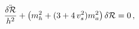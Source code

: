 \begin{equation}\label{fluctuation}
{{\ddot{\delta{\cal R}}}\over h^2} + \left( m_h ^2 + (3+ 4 \, v_s ^2)
  m_a ^2 \right) \delta{\cal R} = 0 \, ,
\end{equation}

